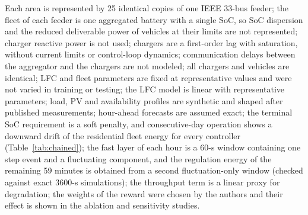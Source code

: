 \documentclass[10pt,a4paper]{article}
\begin{document}
Each area is represented by 25 identical copies of one IEEE 33-bus feeder; the fleet of each feeder is one
aggregated battery with a single SoC, so SoC dispersion and the reduced deliverable power of vehicles at
their limits are not represented; charger reactive power is not used; chargers are a first-order lag with
saturation, without current limits or control-loop dynamics; communication delays between the aggregator and
the chargers are not modeled; all chargers and vehicles are identical; LFC and fleet parameters are fixed at
representative values and were not varied in training or testing; the LFC model is linear with
representative parameters; load, PV and availability profiles are synthetic and shaped after published
measurements; hour-ahead forecasts are assumed exact; the terminal SoC requirement is a soft penalty, and consecutive-day
operation shows a downward drift of the residential fleet energy for every controller (Table~\ref{tab:chained}); the fast layer of each hour is a 60-s window containing
one step event and a fluctuating component, and the regulation energy of the remaining 59 minutes is obtained
from a second fluctuation-only window (checked against exact 3600-s simulations); the throughput term is a
linear proxy for degradation; the weights of the reward were chosen by the authors and their effect is shown
in the ablation and sensitivity studies.
\end{document}
